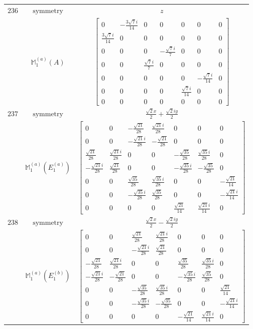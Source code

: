 \documentclass[fleqn,8pt,landscape]{jsarticle}
\begin{document}
\begin{longtable}{ccc}
$ 236 $ & $ \text{symmetry} $ & $ z $ \\
$  $ & $ \mathbb{M}_{1}^{(a)}(A) $ & $ \begin{bmatrix} 0 & - \frac{3 \sqrt{7} i}{14} & 0 & 0 & 0 & 0 & 0 \\ \frac{3 \sqrt{7} i}{14} & 0 & 0 & 0 & 0 & 0 & 0 \\ 0 & 0 & 0 & - \frac{\sqrt{7} i}{7} & 0 & 0 & 0 \\ 0 & 0 & \frac{\sqrt{7} i}{7} & 0 & 0 & 0 & 0 \\ 0 & 0 & 0 & 0 & 0 & - \frac{\sqrt{7} i}{14} & 0 \\ 0 & 0 & 0 & 0 & \frac{\sqrt{7} i}{14} & 0 & 0 \\ 0 & 0 & 0 & 0 & 0 & 0 & 0 \end{bmatrix} $ \\ \hline
$ 237 $ & $ \text{symmetry} $ & $ \frac{\sqrt{2} x}{2} + \frac{\sqrt{2} i y}{2} $ \\
$  $ & $ \mathbb{M}_{1}^{(a)}(E_{1}^{(a)}) $ & $ \begin{bmatrix} 0 & 0 & - \frac{\sqrt{21}}{28} & \frac{\sqrt{21} i}{28} & 0 & 0 & 0 \\ 0 & 0 & - \frac{\sqrt{21} i}{28} & - \frac{\sqrt{21}}{28} & 0 & 0 & 0 \\ \frac{\sqrt{21}}{28} & \frac{\sqrt{21} i}{28} & 0 & 0 & - \frac{\sqrt{35}}{28} & \frac{\sqrt{35} i}{28} & 0 \\ - \frac{\sqrt{21} i}{28} & \frac{\sqrt{21}}{28} & 0 & 0 & - \frac{\sqrt{35} i}{28} & - \frac{\sqrt{35}}{28} & 0 \\ 0 & 0 & \frac{\sqrt{35}}{28} & \frac{\sqrt{35} i}{28} & 0 & 0 & - \frac{\sqrt{21}}{14} \\ 0 & 0 & - \frac{\sqrt{35} i}{28} & \frac{\sqrt{35}}{28} & 0 & 0 & - \frac{\sqrt{21} i}{14} \\ 0 & 0 & 0 & 0 & \frac{\sqrt{21}}{14} & \frac{\sqrt{21} i}{14} & 0 \end{bmatrix} $ \\ \hline
$ 238 $ & $ \text{symmetry} $ & $ \frac{\sqrt{2} x}{2} - \frac{\sqrt{2} i y}{2} $ \\
$  $ & $ \mathbb{M}_{1}^{(a)}(E_{1}^{(b)}) $ & $ \begin{bmatrix} 0 & 0 & \frac{\sqrt{21}}{28} & \frac{\sqrt{21} i}{28} & 0 & 0 & 0 \\ 0 & 0 & - \frac{\sqrt{21} i}{28} & \frac{\sqrt{21}}{28} & 0 & 0 & 0 \\ - \frac{\sqrt{21}}{28} & \frac{\sqrt{21} i}{28} & 0 & 0 & \frac{\sqrt{35}}{28} & \frac{\sqrt{35} i}{28} & 0 \\ - \frac{\sqrt{21} i}{28} & - \frac{\sqrt{21}}{28} & 0 & 0 & - \frac{\sqrt{35} i}{28} & \frac{\sqrt{35}}{28} & 0 \\ 0 & 0 & - \frac{\sqrt{35}}{28} & \frac{\sqrt{35} i}{28} & 0 & 0 & \frac{\sqrt{21}}{14} \\ 0 & 0 & - \frac{\sqrt{35} i}{28} & - \frac{\sqrt{35}}{28} & 0 & 0 & - \frac{\sqrt{21} i}{14} \\ 0 & 0 & 0 & 0 & - \frac{\sqrt{21}}{14} & \frac{\sqrt{21} i}{14} & 0 \end{bmatrix} $ \\ \hline

\end{longtable}
\end{document}
